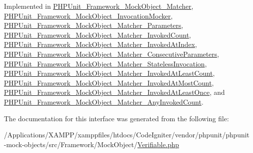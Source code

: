 Implemented in \mbox{\hyperlink{class_p_h_p_unit___framework___mock_object___matcher_aa33600b6a1b28d0c4dfe4d468272aaa4}{P\+H\+P\+Unit\+\_\+\+Framework\+\_\+\+Mock\+Object\+\_\+\+Matcher}}, \mbox{\hyperlink{class_p_h_p_unit___framework___mock_object___invocation_mocker_aa33600b6a1b28d0c4dfe4d468272aaa4}{P\+H\+P\+Unit\+\_\+\+Framework\+\_\+\+Mock\+Object\+\_\+\+Invocation\+Mocker}}, \mbox{\hyperlink{class_p_h_p_unit___framework___mock_object___matcher___parameters_aa33600b6a1b28d0c4dfe4d468272aaa4}{P\+H\+P\+Unit\+\_\+\+Framework\+\_\+\+Mock\+Object\+\_\+\+Matcher\+\_\+\+Parameters}}, \mbox{\hyperlink{class_p_h_p_unit___framework___mock_object___matcher___invoked_count_aa33600b6a1b28d0c4dfe4d468272aaa4}{P\+H\+P\+Unit\+\_\+\+Framework\+\_\+\+Mock\+Object\+\_\+\+Matcher\+\_\+\+Invoked\+Count}}, \mbox{\hyperlink{class_p_h_p_unit___framework___mock_object___matcher___invoked_at_index_aa33600b6a1b28d0c4dfe4d468272aaa4}{P\+H\+P\+Unit\+\_\+\+Framework\+\_\+\+Mock\+Object\+\_\+\+Matcher\+\_\+\+Invoked\+At\+Index}}, \mbox{\hyperlink{class_p_h_p_unit___framework___mock_object___matcher___consecutive_parameters_aa33600b6a1b28d0c4dfe4d468272aaa4}{P\+H\+P\+Unit\+\_\+\+Framework\+\_\+\+Mock\+Object\+\_\+\+Matcher\+\_\+\+Consecutive\+Parameters}}, \mbox{\hyperlink{class_p_h_p_unit___framework___mock_object___matcher___stateless_invocation_aa33600b6a1b28d0c4dfe4d468272aaa4}{P\+H\+P\+Unit\+\_\+\+Framework\+\_\+\+Mock\+Object\+\_\+\+Matcher\+\_\+\+Stateless\+Invocation}}, \mbox{\hyperlink{class_p_h_p_unit___framework___mock_object___matcher___invoked_at_least_count_aa33600b6a1b28d0c4dfe4d468272aaa4}{P\+H\+P\+Unit\+\_\+\+Framework\+\_\+\+Mock\+Object\+\_\+\+Matcher\+\_\+\+Invoked\+At\+Least\+Count}}, \mbox{\hyperlink{class_p_h_p_unit___framework___mock_object___matcher___invoked_at_most_count_aa33600b6a1b28d0c4dfe4d468272aaa4}{P\+H\+P\+Unit\+\_\+\+Framework\+\_\+\+Mock\+Object\+\_\+\+Matcher\+\_\+\+Invoked\+At\+Most\+Count}}, \mbox{\hyperlink{class_p_h_p_unit___framework___mock_object___matcher___invoked_at_least_once_aa33600b6a1b28d0c4dfe4d468272aaa4}{P\+H\+P\+Unit\+\_\+\+Framework\+\_\+\+Mock\+Object\+\_\+\+Matcher\+\_\+\+Invoked\+At\+Least\+Once}}, and \mbox{\hyperlink{class_p_h_p_unit___framework___mock_object___matcher___any_invoked_count_aa33600b6a1b28d0c4dfe4d468272aaa4}{P\+H\+P\+Unit\+\_\+\+Framework\+\_\+\+Mock\+Object\+\_\+\+Matcher\+\_\+\+Any\+Invoked\+Count}}.



The documentation for this interface was generated from the following file\+:\begin{DoxyCompactItemize}
\item 
/\+Applications/\+X\+A\+M\+P\+P/xamppfiles/htdocs/\+Code\+Igniter/vendor/phpunit/phpunit-\/mock-\/objects/src/\+Framework/\+Mock\+Object/\mbox{\hyperlink{_verifiable_8php}{Verifiable.\+php}}\end{DoxyCompactItemize}
